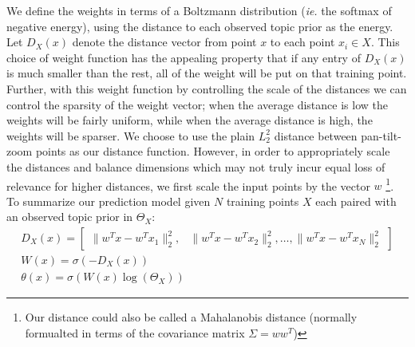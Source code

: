 We define the weights in terms of a Boltzmann distribution (\emph{ie.} the softmax of negative energy), using the distance to each observed topic prior as the energy. Let $D_X(x)$ denote the distance vector from point $x$ to each point $x_i \in X$. This choice of weight function has the appealing property that if any entry of $D_X(x)$ is much smaller than the rest, all of the weight will be put on that training point. Further, with this weight function by controlling the scale of the distances we can control the sparsity of the weight vector; when the average distance is low the weights will be fairly uniform, while when the average distance is high, the weights will be sparser. We choose to use the plain $\mathit{L}_2^2$ distance between pan-tilt-zoom points as our distance function. However, in order to appropriately scale the distances and balance dimensions which may not truly incur equal loss of relevance for higher distances, we first scale the input points by the vector $w$ \footnote{Our distance could also be called a Mahalanobis distance (normally formualted in terms of the covariance matrix $\Sigma = ww^T$)}. To summarize our prediction model given $N$ training points $X$ each paired with an observed topic prior in $\Theta_X$:
\begin{equation}
\begin{split}
    D_X(x) = 
    \begin{bmatrix}
    \|w^Tx - w^T x_1 \|_2^2, & \|w^Tx - w^T x_2 \|_2^2, \ldots, \|w^Tx - w^T x_N \|_2^2
    \end{bmatrix}\\
    W(x) = \sigma \left( -D_{X}(x) \right)\\
    \theta(x) = \sigma \left( W(x) \log \left(\Theta_X \right) \right)
\end{split}
\end{equation}

